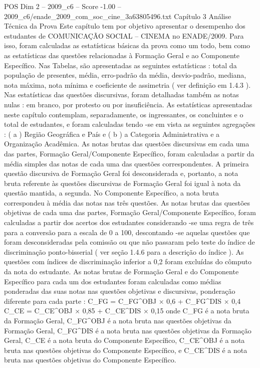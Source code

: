 \begin{textsample}{POS Dim 2 – 2009\_c6 – Score -1.00 – 2009\_c6/enade\_2009\_com\_soc\_cine\_3a63805496.txt}  \label{ex:f2_pos_302}
Capítulo 3 Análise Técnica da Prova Este capítulo tem por objetivo apresentar o desempenho dos estudantes de COMUNICAÇÃO SOCIAL – CINEMA no ENADE/2009.
Para isso, foram calculadas as estatísticas básicas da prova como um todo, bem como as estatísticas das questões relacionadas à Formação Geral e ao Componente Específico.
Nas Tabelas, são apresentadas as seguintes estatísticas : total da população de presentes, média, erro-padrão da média, desvio-padrão, mediana, nota máxima, nota mínima e coeficiente de assimetria ( ver definição em 1.4.3 ).
Nas estatísticas das questões discursivas, foram detalhadas também as notas nulas : em branco, por protesto ou por insuficiência.
As estatísticas apresentadas neste capítulo contemplam, separadamente, os ingressantes, os concluintes e o total de estudantes, e foram calculadas tendo -se em vista as seguintes agregações : ( a ) Região Geográfica e País e ( b ) a Categoria Administrativa e a Organização Acadêmica.
As notas brutas das questões discursivas em cada uma das partes, Formação Geral/Componente Específico, foram calculadas a partir da média simples das notas de cada uma das questões correspondentes.
A primeira questão discursiva de Formação Geral foi desconsiderada e, portanto, a nota bruta referente às questões discursivas de Formação Geral foi igual à nota da questão mantida, a segunda.
No Componente Específico, a nota bruta correspondeu à média das notas nas três questões.
As notas brutas das questões objetivas de cada uma das partes, Formação Geral/Componente Específico, foram calculadas a partir dos acertos dos estudantes considerando -se uma regra de três para a conversão para a escala de 0 a 100, descontando -se aquelas questões que foram desconsideradas pela comissão ou que não passaram pelo teste do índice de discriminação ponto-bisserial ( ver seção 1.4.6 para a descrição do índice ).
As questões com índices de discriminação inferior a 0,2 foram excluídas do cômputo da nota do estudante.
As notas brutas de Formação Geral e do Componente Específico para cada um dos estudantes foram calculadas como médias ponderadas das suas notas nas questões objetivas e discursivas, ponderação diferente para cada parte : C\_FG = C\_FG\textasciicircum{}OBJ × 0,6 + C\_FG\textasciicircum{}DIS × 0,4 C\_CE = C\_CE\textasciicircum{}OBJ × 0,85 + C\_CE\textasciicircum{}DIS × 0,15 onde C\_FG é a nota bruta da Formação Geral, C\_FG\textasciicircum{}OBJ é a nota bruta nas questões objetivas da Formação Geral, C\_FG\textasciicircum{}DIS é a nota bruta nas questões objetivas da Formação Geral, C\_CE é a nota bruta do Componente Específico, C\_CE\textasciicircum{}OBJ é a nota bruta nas questões objetivas do Componente Específico, e C\_CE\textasciicircum{}DIS é a nota bruta nas questões objetivas do Componente Específico.

\end{textsample}
